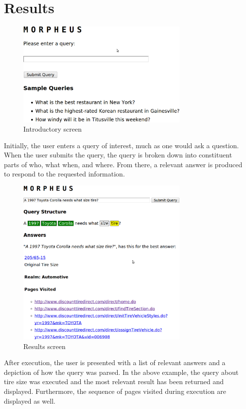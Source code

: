 \section{Results}

\begin{figure}[t]
\centering
\includegraphics[width=85mm]{screen_intro.eps}
\caption{Introductory screen}
\label{fig:screen_intro}
\end{figure}

Initially, the user enters a query of interest, much as one would ask a question. When the user submits the query, the query is broken down into constituent parts of who, what when, and where. From there, a relevant answer is produced to respond to the requested information.

\begin{figure}[t]
\centering
\includegraphics[width=85mm]{screen_result.eps}
\caption{Results screen}
\label{fig:screen_result}
\end{figure}


After execution, the user is presented with a list of relevant answers and a depiction of how the query was parsed. In the above example, the query about tire size was executed and the most relevant result has been returned and displayed. 
Furthermore, the sequence of pages visited during execution are displayed as well. 


